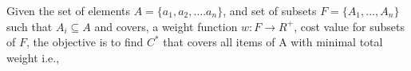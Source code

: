 Given the set of elements $A = \{a_1, a_2,….a_n \}$, and set of subsets $F = \{A_1, . . . , A_n\}$ such that $A_i \subseteq A$ and covers, a weight function $w: F\rightarrow R^+$, cost value for subsets of $F$, the objective is to find $C^*$ that covers all items of A with minimal total weight i.e., 
